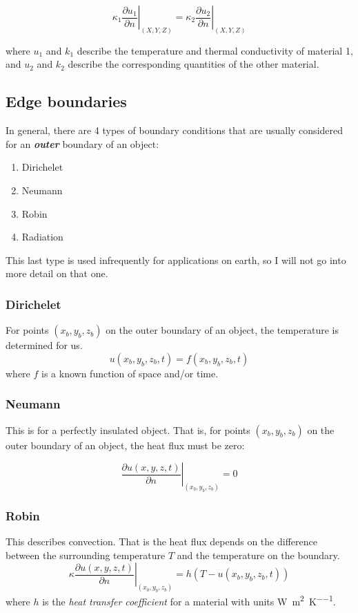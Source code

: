 \documentclass{article}
\begin{document}
\[
  \left. \kappa_1 \frac{\partial u_1}{\partial n}\right|_{(X,Y,Z)} = \left. \kappa_2
    \frac{\partial u_2}{\partial n}\right|_{(X,Y,Z)}
\]

where \(u_1\) and \(k_1\) describe the temperature and thermal conductivity of material 1, and
\(u_2\) and \(k_2\) describe the corresponding quantities of the other material.


\subsection{Edge boundaries}

In general, there are 4 types of boundary conditions that are usually considered for an
\textbf{\emph{outer}} boundary of an object:
\begin{enumerate}
  \item Dirichelet
  \item Neumann
  \item Robin
  \item Radiation
\end{enumerate}
This last type is used infrequently for applications on earth, so I will not go into more
detail on that one.


\subsubsection{Dirichelet}

For points \((x_b,y_b,z_b)\) on the outer boundary of an object, the temperature is determined
for us.
\[
  u(x_b,y_b,z_b,t) = f(x_b,y_b,z_b,t)
\]
where \(f\) is a known function of space and/or time.


\subsubsection{Neumann}

This is for a perfectly insulated object. That is, for points \((x_b,y_b,z_b)\) on the outer
boundary of an object, the heat flux must be zero:

\[
  \left. \frac{\partial u(x,y,z,t)}{\partial n}\right|_{(x_b,y_b,z_b)} = 0
\]


\subsubsection{Robin}
This describes convection. That is the heat flux depends on the difference between the
surrounding temperature \(T\) and the temperature on the boundary.
\[
  \left. \kappa \frac{\partial u(x,y,z,t)}{\partial n}\right|_{(x_b,y_b,z_b)} = h (T -
  u(x_b,y_b,z_b,t))
\]
where \(h\) is the \emph{heat transfer coefficient} for a material with units
\unit{\watt\per\meter^2\per\kelvin}.
\end{document}
